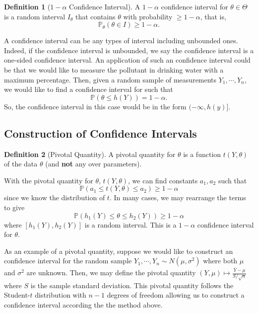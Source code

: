 \documentclass[
]{article}
\theoremstyle{definition}
\theoremstyle{definition}
\newtheorem{definition}{Definition}[section]
\begin{document}
\begin{definition}[\(1 - \alpha\) Confidence Interval]
  A \(1 - \alpha\) confidence interval for \(\theta \in \Theta\) is a random 
  interval \(I_\theta\) that contains \(\theta\) with probability \(\ge 1 - \alpha\), 
  that is, 
  \[\mathbb{P}_\theta(\theta \in I) \ge 1 - \alpha.\]
\end{definition}

A confidence interval can be any types of interval including unbounded
ones. Indeed, if the confidence interval is unbounded, we say the
confidence interval is a one-sided confidence interval. An application
of such an confidence interval could be that we would like to measure
the pollutant in drinking water with a maximum percentage. Then, given a
random sample of measurements \(Y_1, \cdots, Y_n\), we would like to
find a confidence interval for such that
\[\mathbb{P}(\theta \le h(Y)) = 1 - \alpha.\] So, the confidence
interval in this case would be in the form \((-\infty, h(y)]\).

\hypertarget{construction-of-confidence-intervals}{%
\subsection{Construction of Confidence
Intervals}\label{construction-of-confidence-intervals}}

\begin{definition}[Pivotal Quantity]
  A pivotal quantity for \(\theta\) is a function \(t(Y, \theta)\) of the data 
  \(\theta\) (and \textbf{not} any over parameters).
\end{definition}

With the pivotal quantity for \(\theta\), \(t(Y, \theta)\), we can find
constants \(a_1, a_2\) such that
\[\mathbb{P}(a_1 \le t(Y, \theta) \le a_2) \ge 1 - \alpha\] since we
know the distribution of \(t\). In many cases, we may rearrange the
terms to give
\[\mathbb{P}(h_1(Y) \le \theta \le h_2(Y)) \ge 1 - \alpha\] where
\([h_1(Y), h_2(Y)]\) is a random interval. This is a \(1 - \alpha\)
confidence interval for \(\theta\).

As an example of a pivotal quantity, suppose we would like to construct
an confidence interval for the random sample
\(Y_1, \cdots, Y_n \sim N(\mu, \sigma^2)\) where both \(\mu\) and
\(\sigma^2\) are unknown. Then, we may define the pivotal quantity
\((Y, \mu) \mapsto \frac{\bar{Y} - \mu}{S / \sqrt{n}}\) where \(S\) is
the sample standard deviation. This pivotal quantity follows the
Student-\(t\) distribution with \(n- 1\) degrees of freedom allowing us
to construct a confidence interval according the the method above.
\end{document}
